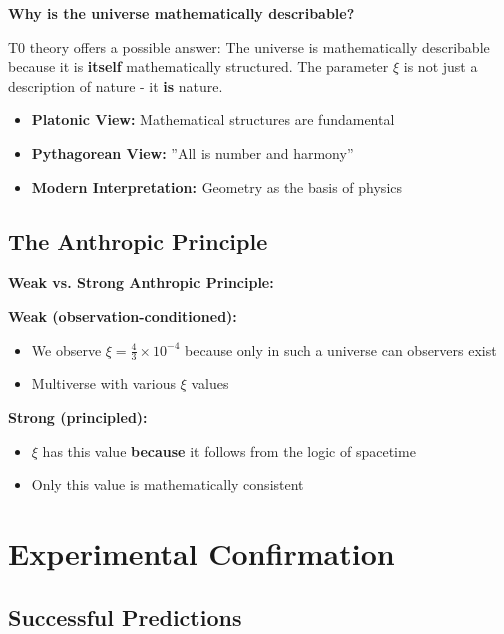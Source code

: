 \documentclass[12pt,a4paper]{article}
\begin{document}
	\begin{foundation}
		\textbf{Why is the universe mathematically describable?}
		
		T0 theory offers a possible answer: The universe is mathematically describable because it is \textbf{itself} mathematically structured. The parameter $\xi$ is not just a description of nature - it \textbf{is} nature.
		
		\begin{itemize}
			\item \textbf{Platonic View:} Mathematical structures are fundamental
			\item \textbf{Pythagorean View:} ''All is number and harmony''
			\item \textbf{Modern Interpretation:} Geometry as the basis of physics
		\end{itemize}
	\end{foundation}
	
	\subsection{The Anthropic Principle}
	
	\begin{alternative}
		\textbf{Weak vs. Strong Anthropic Principle:}
		
		\textbf{Weak (observation-conditioned):}
		\begin{itemize}
			\item We observe $\xi = \frac{4}{3} \times 10^{-4}$ because only in such a universe can observers exist
			\item Multiverse with various $\xi$ values
		\end{itemize}
		
		\textbf{Strong (principled):}
		\begin{itemize}
			\item $\xi$ has this value \textbf{because} it follows from the logic of spacetime
			\item Only this value is mathematically consistent
		\end{itemize}
	\end{alternative}
	
	\section{Experimental Confirmation}
	
	\subsection{Successful Predictions}
	
\end{document}
